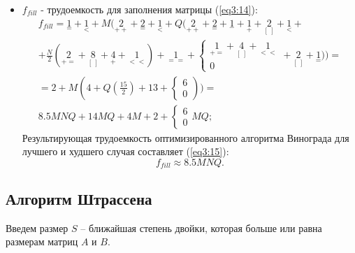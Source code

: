 \begin{itemize}
	\item $f_{fill}$ - трудоемкость для заполнения матрицы (\ref{eq3:14}):
	\begin{multline}
		f_{fill} = {\underset{=}{1}} + {\underset{<}{1}} + M({\underset{++}{2}} + {\underset{=}{2}} + {\underset{<}{1}} + Q({\underset{++}{2}} + {\underset{=}{2}} + {\underset{-}{1}} + {\underset{+}{1}} + {\underset{[\ ]}{2}} + {\underset{<}{1}} + \\
		+ \frac{N}{2}({\underset{+=}{2}} + {\underset{[\ ]}{8}} + {\underset{+}{4}} + {\underset{<<}{1}}) + {\underset{==}{1}} 
		+  \begin{cases}
			{\underset{+=}{1}} + {\underset{[ \ ]}{4}} + {\underset{<<}{1}}\\
			0
		\end{cases} + {\underset{[\ ]}{2}} + {\underset{=}{1}})) = \\
		= 2 + M(4 + Q(\frac{15}{2}) + 13 + \begin{cases}
			6\\
			0
		\end{cases})) = \\
		8.5MNQ + 14MQ + 4M + 2 + \begin{cases}
			6\\
			0
		\end{cases} MQ;
		\label{eq3:14}
	\end{multline}
	Результирующая трудоемкость оптимизированного алгоритма Винограда для лучшего и худшего случая составляет (\ref{eq3:15}):
	\begin{equation}
		f_{fill} \approx 8.5MNQ.
		\label{eq3:15}
	\end{equation}
	
\end{itemize}

\subsection{Алгоритм Штрассена}

Введем размер $S$ -- ближайшая степень двойки, которая больше или равна размерам матриц $A$ и $B$.

